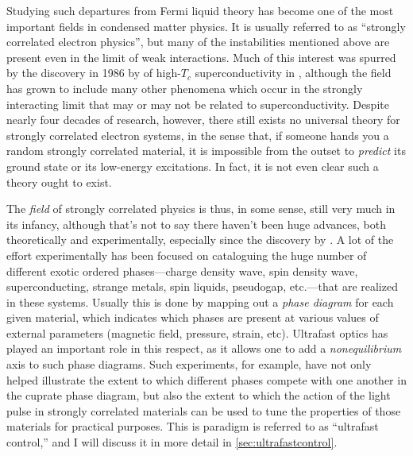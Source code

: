 Studying such departures from Fermi liquid theory has become one of the most important fields in condensed matter physics.
It is usually referred to as ``strongly correlated electron physics'', but many of the instabilities mentioned above are present even in the limit of weak interactions.
Much of this interest was spurred by the discovery in \num{1986} by \citet{bednorz_possible_1986} of high-$T_c$ superconductivity in , although the field has grown to include many other phenomena which occur in the strongly interacting limit that may or may not be related to superconductivity.
Despite nearly four decades of research, however, there still exists no universal theory for strongly correlated electron systems, in the sense that, if someone hands you a random strongly correlated material, it is impossible from the outset to \emph{predict} its ground state or its low-energy excitations.
In fact, it is not even clear such a theory ought to exist\citep{alexandradinata_future_2022}.

The \emph{field} of strongly correlated physics is thus, in some sense, still very much in its infancy, although that's not to say there haven't been huge advances, both theoretically and experimentally, especially since the discovery by \citet{bednorz_possible_1986}.
A lot of the effort experimentally has been focused on cataloguing the huge number of different exotic ordered phases---charge density wave, spin density wave, superconducting, strange metals, spin liquids, pseudogap, etc.---that are realized in these systems.
Usually this is done by mapping out a \emph{phase diagram} for each given material, which indicates which phases are present at various values of external parameters (magnetic field, pressure, strain, etc).
Ultrafast optics has played an important role in this respect, as it allows one to add a \emph{nonequilibrium} axis to such phase diagrams.
Such experiments, for example, have not only helped illustrate the extent to which different phases compete with one another in the cuprate phase diagram, but also the extent to which the action of the light pulse in strongly correlated materials can be used to tune the properties of those materials for practical purposes.
This is paradigm is referred to as ``ultrafast control,'' and I will discuss it in more detail in \cref{sec:ultrafastcontrol}.

